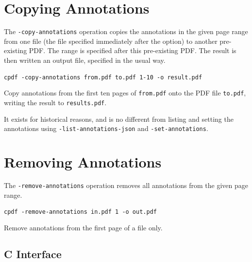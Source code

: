 \documentclass{book}
\begin{document}
  \section{Copying Annotations}
  The \texttt{-copy-annotations} operation copies the annotations in the given
page range from one file (the file specified immediately after the option) to
another pre-existing PDF. The range is specified after this pre-existing PDF.
The result is then written an output file, specified in the usual way.
  \begin{framed}
    \noindent\small\verb!cpdf -copy-annotations from.pdf to.pdf 1-10 -o result.pdf !
    
    \vspace{2.5mm}
    \noindent Copy annotations from the first ten pages of \texttt{from.pdf}
onto the PDF file \texttt{to.pdf}, writing the result to \texttt{results.pdf}.

  \end{framed}

\noindent It exists for historical reasons, and is no different from listing and setting the annotations using \texttt{-list-annotations-json} and \texttt{-set-annotations}. 

  \section{Removing Annotations}
  The \texttt{-remove-annotations} operation removes all annotations from the
given page range.

  \begin{framed}
    \noindent\small\verb!cpdf -remove-annotations in.pdf 1 -o out.pdf!
    
    \vspace{2.5mm}
    \noindent Remove annotations from the first page of a file only.
  \end{framed}

\pagestyle{empty}\thispagestyle{fancy}

\begin{cpdflib}
\clearpage
\section*{C Interface}
\begin{small}\tt

\end{small}
\end{cpdflib}
\end{document}
